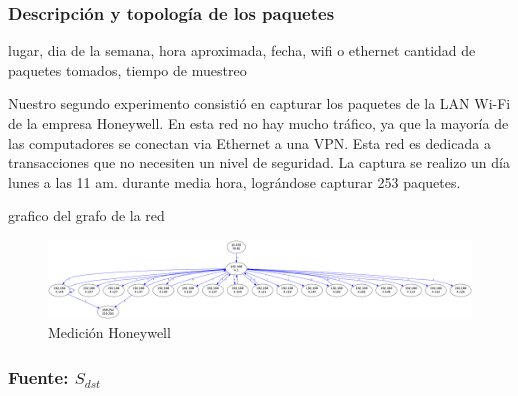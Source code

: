 \subsubsection{Descripción y topología de los paquetes}

lugar, dia de la semana, hora aproximada, fecha, wifi o ethernet
cantidad de paquetes tomados, tiempo de muestreo

Nuestro segundo experimento consistió en capturar los paquetes de la LAN Wi-Fi de la empresa Honeywell. En esta red no hay mucho tráfico, ya que la mayoría de las computadores se conectan via Ethernet a una VPN. Esta red es dedicada a transacciones que no necesiten un nivel de seguridad. La captura se realizo un día lunes a las 11 am. durante media hora, lográndose capturar 253 paquetes.  

grafico del grafo de la red

\begin{figure}[H]
 \begin{center}
  \includegraphics[width=\linewidth]{../imgs/prueba_laburo-ips_red.png}
  \caption{Medición Honeywell}
 \end{center}
\end{figure}


\subsubsection{Fuente: $S_{dst}$}

